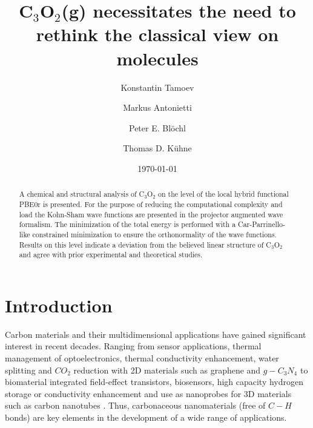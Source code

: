 \documentclass[%
 reprint,
nofootinbib,
 amsmath,amssymb,
 aps,
]{revtex4-2}
\begin{document}

\title{C$_3$O$_2$(g) necessitates the need to rethink the classical view on molecules}%

\author{Konstantin Tamoev}
\author{Markus Antonietti}
\author{Peter E. Bl\"ochl}
\author{Thomas D. K\"uhne}
%

\date{\today}%

\begin{abstract}
A chemical and structural analysis of C$_3$O$_2$ on the level of the local hybrid functional PBE0r is presented. For the purpose of reducing the computational complexity and load the Kohn-Sham wave functions are presented in the projector augmented wave formalism. The minimization of the total energy is performed with a Car-Parrinello-like constrained minimization to ensure the orthonormality of the wave functions. Results on this level indicate a deviation from the believed linear structure of C$_3$O$_2$ and agree with prior experimental and theoretical studies. 
\end{abstract}


\maketitle

\section{\label{sec:level1} Introduction}
Carbon materials and their multidimensional applications have gained significant interest in recent decades. Ranging from sensor applications, thermal management of optoelectronics, thermal conductivity enhancement, water splitting and $CO_2$ reduction with 2D materials such as graphene \cite{graphene1, graphene2, graphene3, graphene4} and $g-C_3N_4$ \cite{c3n4_1, c3n4_2, c3n4_3} to biomaterial integrated field-effect transistors, biosensors, high capacity hydrogen storage or conductivity enhancement and use as nanoprobes for 3D materials such as carbon nanotubes \cite{cnt1, cnt2, cnt3,cnt4}. Thus, carbonaceous nanomaterials (free of $C-H$ bonds) are key elements in the development of a wide range of applications.
\end{document}
